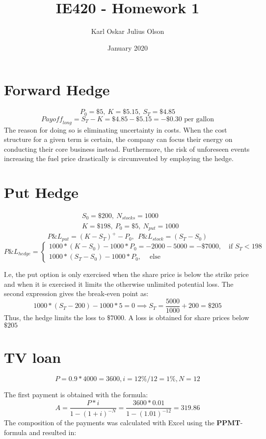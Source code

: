 \documentclass{article}
\title{IE420 - Homework 1}
\author{Karl Oskar Julius Olson}
\date{January 2020}
\begin{document}
\thispagestyle{fancy}


\section{Forward Hedge}

$$ P_0 = \$5, \  K = \$5.15, \ S_T = \$ 4.85$$
$${Payoff}_{long} = S_T - K = \$4.85 - \$5.15 = -\$0.30 \text{ per gallon} $$
The reason for doing so is eliminating uncertainty in costs. When the cost structure for a given term is certain, the company can focus their energy on conducting their core business instead. Furthermore, the risk of unforeseen events increasing the fuel price drastically is circumvented by employing the hedge. 

\section{Put Hedge}
\begin{align*}
	&S_0 = \$200, \ N_{stocks} = 1000 \\
	&K = \$198, \ P_0 = \$5, \ N_{put} = 1000
\end{align*}
$$P\&L_{put} = (K-S_T)^+ - P_0, \ \ P\&L_{stock} = (S_T - S_0)$$
$$P\&L_{hedge} = \begin{cases} 1000 * (K - S_0) - 1000 * P_0 = -2000 - 5000 = -\$7000, \ \ \ \text{ if $S_T < 198$ } \\ 1000*(S_T - S_0) - 1000*P_0, \ \ \ \   \text{ else} \end{cases} $$

I.e, the put option is only exercised when the share price is below the strike price and when it is exercised it limits the otherwise unlimited potential loss. The second expression gives the break-even point as:
$$1000 * (S_T- 200)-1000 * 5 = 0 \implies S_T = \frac{5000}{1000} + 200 = \$205$$
Thus, the hedge limits the loss to $\$7000$. A loss is obtained for share prices below $\$205$


\section{TV loan}

$$P = 0.9 * 4000 = 3600, i = 12\% / 12 = 1\%, N = 12$$

The first payment is obtained with the formula: 
$$A = \frac{P*i}{1-(1+i)^{-N}} = \frac{3600 * 0.01}{1-(1.01)^{-12}} = 319.86$$
The composition of the payments was calculated with Excel using the \textbf{PPMT}-formula and resulted in:
\end{document}
